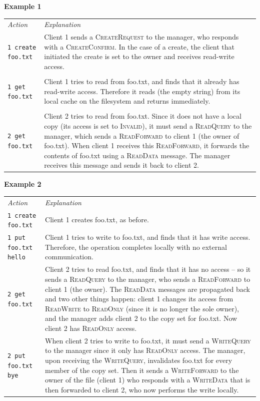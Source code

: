 \documentclass[12pt]{article}	%
\begin{document}
\begin{center} \textbf{Example 1} \end{center}

\begin{tabular}{p{1.5in}|p{3.3in}}
\emph{Action} & \emph{Explanation} \\
\texttt{1 create foo.txt} & Client 1 sends a \textsc{CreateRequest} to the manager, who responds with a \textsc{CreateConfirm}. In the case of a create, the client that initiated the create is set to the owner and receives read-write access. \\
\\
\texttt{1 get foo.txt} & Client 1 tries to read from foo.txt, and finds that it already has read-write access. Therefore it reads (the empty string) from its local cache on the filesystem and returns immediately. \\
\\
\texttt{2 get foo.txt} & Client 2 tries to read from foo.txt. Since it does not have a local copy (its access is set to \textsc{Invalid}), it must send a \textsc{ReadQuery} to the manager, which sends a \textsc{ReadForward} to client 1 (the owner of foo.txt). When client 1 receives this \textsc{ReadForward}, it forwards the contents of foo.txt using a \textsc{ReadData} message. The manager receives this message and sends it back to client 2. \\
\end{tabular}

\begin{center} \textbf{Example 2} \end{center}

\begin{tabular}{p{1.7in}|p{3.3in}}
\emph{Action} & \emph{Explanation} \\
\texttt{1 create foo.txt} & Client 1 creates foo.txt, as before. \\
\texttt{1 put foo.txt hello} & Client 1 tries to write to foo.txt, and finds that it has write access. Therefore, the operation completes locally with no external communication. \\
\texttt{2 get foo.txt} & Client 2 tries to read foo.txt, and finds that it has no access -- so it sends a \textsc{ReadQuery} to the manager, who sends a \textsc{ReadForward} to client 1 (the owner). The \textsc{ReadData} messages are propagated back and two other things happen: client 1 changes its access from \textsc{ReadWrite} to \textsc{ReadOnly} (since it is no longer the sole owner), and the manager adds client 2 to the copy set for foo.txt. Now client 2 has \textsc{ReadOnly} access. \\
\texttt{2 put foo.txt bye} & When client 2 tries to write to foo.txt, it must send a \textsc{WriteQuery} to the manager since it only has \textsc{ReadOnly} access. The manager, upon receiving the \textsc{WriteQuery}, invalidates foo.txt for every member of the copy set. Then it sends a \textsc{WriteForward} to the owner of the file (client 1) who responds with a \textsc{WriteData} that is then forwarded to client 2, who now performs the write locally. \\
\end{tabular}
\end{document}
